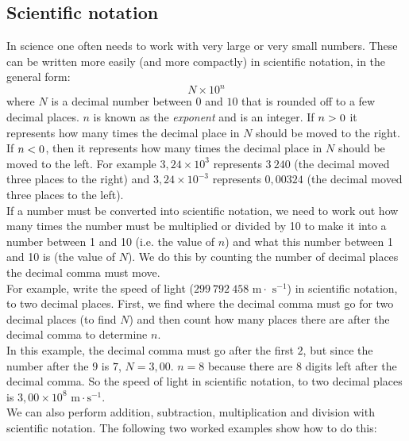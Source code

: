 \subsection*{Scientific notation}
In science one often needs to work with very large or very small numbers. These can be written more easily (and more compactly) in scientific notation, in the general form:       
    \begin{equation*}
    N \times 10^{n}
      \end{equation*}
where $N$ is a decimal number between $0$ and $10$ that is rounded off to a few decimal places. $n$ is known as the \textsl{exponent} and is an integer. If $n>{}0$ it represents how many times the decimal place in $N$ should be moved to the right. If $n<{}0$, then it represents how many times the decimal place in $N$ should be moved to the left. For example $3,24\ensuremath{\times}{10}^{3}$ represents $3~240$ (the decimal moved three places to the right) and $3,24\ensuremath{\times}{10}^{-3}$ represents $0,00324$ (the decimal moved three places to the left).\\
If a number must be converted into scientific notation, we need to work out how many times the number must be multiplied or divided by 10 to make it into a number between 1 and 10 (i.e.\@{} the value of $n$) and what this number between 1 and 10 is (the value of $N$). We do this by counting the number of decimal places the decimal comma must move.\\
For example, write the speed of light ($299 ~792 ~458 \text{ m} \cdot \text{ s}^{-1}$) in scientific notation, to two decimal places. First, we find where the decimal comma must go for two decimal places (to find $N$) and then count how many places there are after the decimal comma to determine $n$.\\
In this example, the decimal comma must go after the first $2$, but since the number after the $9$ is $7$, $N=3,00$. $n=8$ because there are $8$ digits left after the decimal comma. So the speed of light in scientific notation, to two decimal places is $3,00 \times 10^{8} \text{ m} \cdot \text{s}^{-1}$. \\
We can also perform addition, subtraction, multiplication and division with scientific notation. The following two worked examples show how to do this: \vspace{-1cm}
